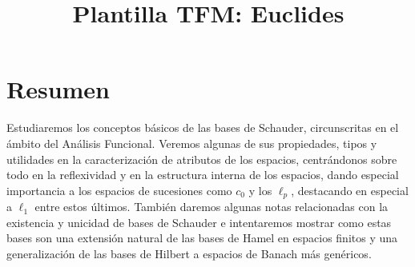 \title{Plantilla TFM: Euclides}









\newcommand{\vertiii}[1]{{\left\vert\kern-0.25ex\left\vert\kern-0.25ex\left\vert #1 
		\right\vert\kern-0.25ex\right\vert\kern-0.25ex\right\vert}}
\def\N{\ensuremath{\mathbb{N}}} %
\def\R{\ensuremath{\mathbb{R}}} %
\def\C{\ensuremath{\mathbb{C}}} %
\def\Q{\ensuremath{\mathbb{Q}}}
\def\K{\ensuremath{\mathbb{K}}}

\makeglossaries

\glsaddall %


	\frontmatter\pagestyle{empty} %


	\pagestyle{plain}\setcounter{page}{1} %
	\tableofcontents
	
	\clearpage
	
	\section*{Resumen}
	
	Estudiaremos los conceptos básicos de las bases de Schauder, circunscritas en el ámbito del Análisis Funcional. Veremos algunas de sus propiedades, tipos y utilidades en la caracterización de atributos de los espacios, centrándonos sobre todo en la reflexividad y en la estructura interna de los espacios, dando especial importancia a los espacios de sucesiones como $c_0$ y los $\ell_p$, destacando en especial a $\ell_1$ entre estos últimos. También daremos algunas notas relacionadas con la existencia y unicidad de bases de Schauder e intentaremos mostrar como estas bases son una extensión natural de las bases de Hamel en espacios finitos y una generalización de las bases de Hilbert a espacios de Banach más genéricos.
	
